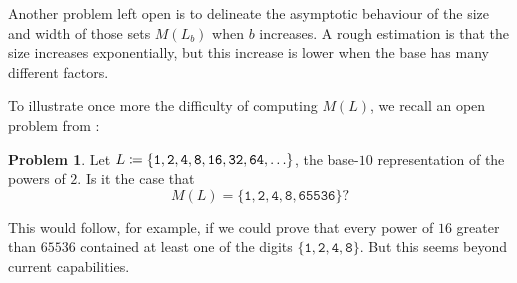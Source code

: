 \documentclass[12pt]{article}
\theoremstyle{plain}
\theoremstyle{definition}
\newtheorem{problem}[theorem]{Problem}
\newcommand{\0}{\mathtt{0}}
\newcommand{\1}{\mathtt{1}}
\newcommand{\2}{\mathtt{2}}
\newcommand{\3}{\mathtt{3}}
\newcommand{\4}{\mathtt{4}}
\newcommand{\5}{\mathtt{5}}
\newcommand{\6}{\mathtt{6}}
\newcommand{\7}{\mathtt{7}}
\newcommand{\8}{\mathtt{8}}
\newcommand{\9}{\mathtt{9}}
\begin{document}
Another problem left open is to delineate the asymptotic behaviour of the size and width of those sets $M(L_b)$ when $b$ increases.
A rough estimation is that the size increases exponentially, but this increase is lower when the base has many different factors.

To illustrate once more the difficulty of computing $M(L)$, we recall
an open problem from \cite{Sh00}:

\begin{problem} 
Let $L \coloneqq \lbrace {\tt 1, 2, 4, 8, 16, 32, 64, } \ldots \rbrace$, the
base-$10$ representation of the powers of $2$.  
Is it the case that
$$ M(L) = \lbrace \1, \2, \4, \8, \6\5\5\3\6 \rbrace ? $$
\end{problem}

This would follow, for example, if we could prove that every power
of $16$ greater than $65536$ contained at least one of the digits
$\lbrace \1, \2, \4, \8 \rbrace$.  But this seems beyond current capabilities.
\end{document}
